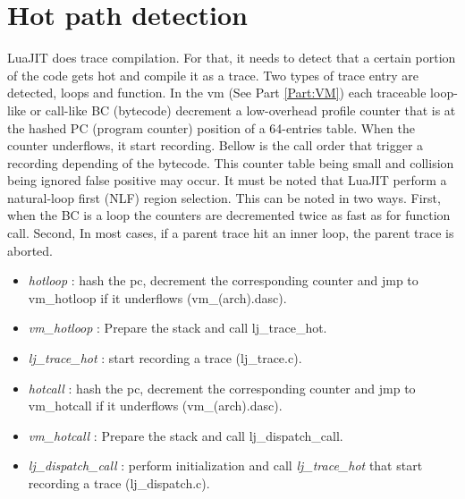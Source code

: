 

\section{Hot path detection}
\label{Sec:hot-path}

LuaJIT does trace compilation. For that, it needs to detect that a certain
portion of the code gets hot and compile it as a trace. Two types of trace entry
are detected, loops and function. In the vm (See Part \ref{Part:VM}) each
traceable loop-like or call-like BC (bytecode) decrement a low-overhead profile
counter that is at the hashed PC (program counter) position of a 64-entries table.
When the counter underflows, it start recording. Bellow is the call order that
trigger a recording depending of the bytecode. This counter table being small
and collision being ignored false positive may occur.
It must be noted that LuaJIT perform a natural-loop first (NLF) region selection.
This can be noted in two ways. First, when the BC is a loop the counters are
decremented twice as fast as for function call. Second, In most cases, if a
parent trace hit an inner loop, the parent trace is aborted.


\begin{itemize}
	\item \emph{hotloop} : hash the pc, decrement the corresponding counter and
jmp to vm\_hotloop if it underflows (vm\_(arch).dasc).
	\item \emph{vm\_hotloop} : Prepare the stack and call lj\_trace\_hot.
	\item \emph{lj\_trace\_hot} : start recording a trace (lj\_trace.c).
\end{itemize}


\begin{itemize}
	\item \emph{hotcall} : hash the pc, decrement the corresponding counter and
jmp to vm\_hotcall if it underflows (vm\_(arch).dasc).
	\item \emph{vm\_hotcall} : Prepare the stack and call lj\_dispatch\_call.
	\item \emph{lj\_dispatch\_call} : perform initialization
	and call \emph{lj\_trace\_hot} that start recording a trace (lj\_dispatch.c).
\end{itemize}

